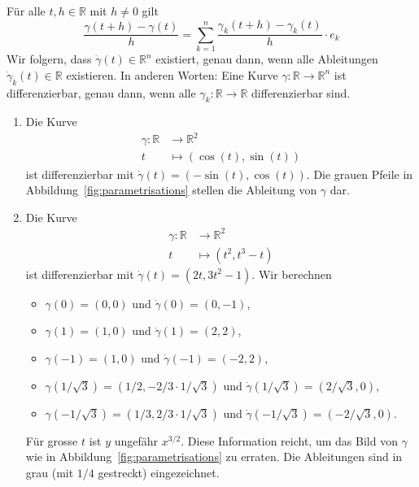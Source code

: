 \documentclass[../main.tex]{subfiles}
\begin{document}
\begin{remark}
  Für alle $t, h \in \mathbb{R}$ mit $h \neq 0$ 
  gilt
  \[
    \frac{\gamma(t + h) - \gamma(t)}{h}
    = \sum_{k=1}^{n} \frac{\gamma_k(t + h)- \gamma_k(t)}{h} \cdot e_k
  \]
  Wir folgern, dass $\dot{\gamma}(t) \in \mathbb{R}^n$ existiert,
  genau dann, wenn alle Ableitungen $\dot{\gamma}_k(t) \in \mathbb{R}$ 
  existieren.
  In anderen Worten: Eine Kurve $\gamma \colon \mathbb{R} \to \mathbb{R}^n$ 
  ist differenzierbar, genau dann, wenn alle $\gamma_k \colon \mathbb{R}
  \to \mathbb{R}$ differenzierbar sind.
\end{remark}

\begin{examples}
  \leavevmode
  \begin{enumerate}[(1)]
    \item Die Kurve
      \begin{align*}
        \gamma \colon \mathbb{R} & \to \mathbb{R}^2 \\
        t & \mapsto (\cos(t), \sin(t))
      \end{align*}
      ist differenzierbar mit $\dot{\gamma}(t) = (-\sin(t), \cos(t))$.
      Die grauen Pfeile in Abbildung~\ref{fig:parametrisations}
      stellen die Ableitung von $\gamma$ dar.
    \item Die Kurve
      \begin{align*}
        \gamma \colon \mathbb{R} & \to \mathbb{R}^2 \\
        t & \mapsto (t^2, t^3 - t)
      \end{align*}
      ist differenzierbar mit $\dot{\gamma}(t) = (2t, 3t^2 - 1)$.
      Wir berechnen
      \begin{itemize}
        \item $\gamma(0) = (0, 0)$ und $\dot{\gamma}(0) = (0, -1)$,
        \item $\gamma(1) = (1, 0)$ und $\dot{\gamma}(1) = (2, 2)$,
        \item $\gamma(-1) = (1, 0)$ und $\dot{\gamma}(-1) = (-2, 2)$,
        \item $\gamma(1/\sqrt{3}) = (1/2, -2/3 \cdot 1/\sqrt{3})$
          und $\dot \gamma (1/\sqrt{3}) = (2 / \sqrt 3, 0)$,
        \item $\gamma(-1 / \sqrt 3) = (1 / 3, 2/ 3 \cdot 1 / \sqrt 3)$
          und $\dot \gamma ( - 1 / \sqrt 3 ) = (- 2 / \sqrt 3, 0)$.
      \end{itemize}
     Für grosse $t$ ist $y$ ungefähr $x^{3/2}$. Diese Information reicht,
     um das Bild von $\gamma$ wie in Abbildung~\ref{fig:parametrisations}
     zu erraten.
     Die Ableitungen sind in grau (mit $1/4$ gestreckt) eingezeichnet.
  \end{enumerate}
\end{examples}
\end{document}
